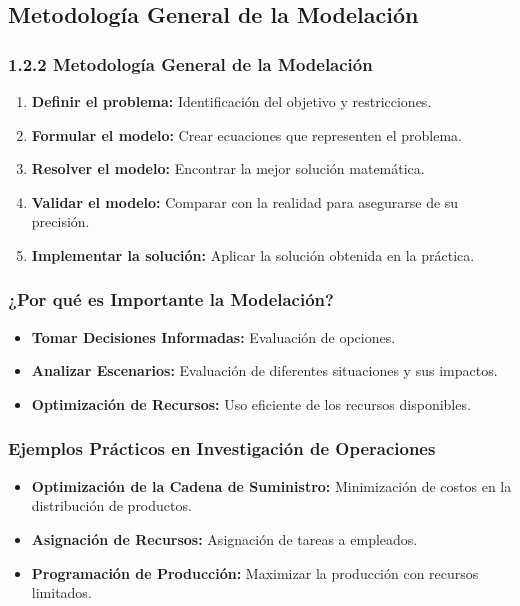 \documentclass{beamer}
\begin{document}
\subsection{Metodología General de la Modelación}
\begin{frame}
    \frametitle{1.2.2 Metodología General de la Modelación}
    \begin{enumerate}
        \item \textbf{Definir el problema:} Identificación del objetivo y restricciones.
        \item \textbf{Formular el modelo:} Crear ecuaciones que representen el problema.
        \item \textbf{Resolver el modelo:} Encontrar la mejor solución matemática.
        \item \textbf{Validar el modelo:} Comparar con la realidad para asegurarse de su precisión.
        \item \textbf{Implementar la solución:} Aplicar la solución obtenida en la práctica.
    \end{enumerate}
\end{frame}

\begin{frame}
    \frametitle{¿Por qué es Importante la Modelación?}
    \begin{itemize}
        \item \textbf{Tomar Decisiones Informadas:} Evaluación de opciones.
        \item \textbf{Analizar Escenarios:} Evaluación de diferentes situaciones y sus impactos.
        \item \textbf{Optimización de Recursos:} Uso eficiente de los recursos disponibles.
    \end{itemize}
\end{frame}

\begin{frame}
    \frametitle{Ejemplos Prácticos en Investigación de Operaciones}
    \begin{itemize}
        \item \textbf{Optimización de la Cadena de Suministro:} Minimización de costos en la distribución de productos.
        \item \textbf{Asignación de Recursos:} Asignación de tareas a empleados.
        \item \textbf{Programación de Producción:} Maximizar la producción con recursos limitados.
    \end{itemize}
\end{frame}
\end{document}
